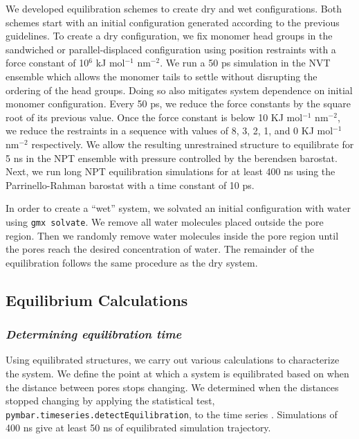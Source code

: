 \documentclass[journal=jpcbfk,manusciprt=article]{achemso}
\begin{document}
  We developed equilibration schemes to create dry and wet configurations. Both
  schemes start with an initial configuration generated according to the previous
  guidelines. To create a dry configuration, we fix monomer head groups in the
  sandwiched or parallel-displaced configuration using position restraints with a
  force constant of 10$^6$ kJ mol$^{-1}$ nm$^{-2}$. We run a 50 ps simulation in
  the NVT ensemble which allows the monomer tails to settle without disrupting
  the ordering of the head groups. Doing so also mitigates system dependence on
  initial monomer configuration. Every 50 ps, we reduce the force constants by
  the square root of its previous value. Once the force constant is below 10 KJ
  mol$^{-1}$ nm$^{-2}$, we reduce the restraints in a sequence with values of
  8, 3, 2, 1, and 0 KJ mol$^{-1}$ nm$^{-2}$ respectively. We allow the resulting
  unrestrained structure to equilibrate for 5 ns in the NPT ensemble
  with pressure controlled by the berendsen barostat. Next, we run long NPT
  equilibration simulations for at least 400 ns using the Parrinello-Rahman
  barostat with a time constant of 10 ps.

  In order to create a ``wet'' system, we solvated an initial configuration with
  water using \texttt{gmx solvate}. We remove all water molecules placed outside
  the pore region. Then we randomly remove water molecules inside the pore region
  until the pores reach the desired concentration of water. The remainder of the
  equilibration follows the same procedure as the dry system. 

  \subsection{Equilibrium Calculations}

  \subsubsection{\textit{Determining equilibration time}}\label{method:equil_time}

  Using equilibrated structures, we carry out various calculations to
  characterize the system. We define the point at which a system is equilibrated
  based on when the distance between pores stops changing.  We determined when
  the distances stopped changing by applying the statistical test,
  \texttt{pymbar.timeseries.detectEquilibration}, to the time series
  \cite{chodera_simple_2016,shirts_statistically_2008}. Simulations of 400 ns
  give at least 50 ns of equilibrated simulation trajectory.
\end{document}
